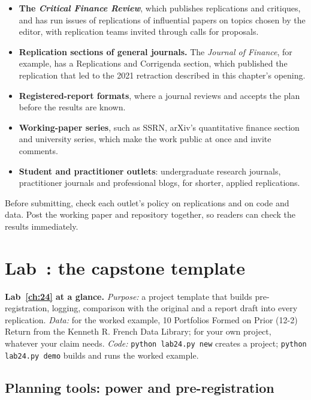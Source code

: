 \begin{itemize}
  \item \textbf{The \emph{Critical Finance Review}}, which publishes replications and critiques, and has run issues of replications of influential papers on topics chosen by the editor, with replication teams invited through calls for proposals.
  \item \textbf{Replication sections of general journals.} The \emph{Journal of Finance}, for example, has a Replications and Corrigenda section, which published the replication that led to the 2021 retraction described in this chapter's opening.
  \item \textbf{Registered-report formats}, where a journal reviews and accepts the plan before the results are known.
  \item \textbf{Working-paper series}, such as SSRN, arXiv's quantitative finance section and university series, which make the work public at once and invite comments.
  \item \textbf{Student and practitioner outlets}: undergraduate research journals, practitioner journals and professional blogs, for shorter, applied replications.
\end{itemize}

Before submitting, check each outlet's policy on replications and on code and data. Post the working paper and repository together, so readers can check the results immediately.

\section{Lab~\thechapter: the capstone template}
\label{sec:24-lab}

\begin{callout}
\textbf{Lab~\ref{ch:24} at a glance.} \emph{Purpose:} a project template that builds pre-registration, logging, comparison with the original and a report draft into every replication. \emph{Data:} for the worked example, 10 Portfolios Formed on Prior (12-2) Return from the Kenneth R. French Data Library; for your own project, whatever your claim needs. \emph{Code:} \texttt{python lab24.py new} creates a project; \texttt{python lab24.py demo} builds and runs the worked example.
\end{callout}

\subsection*{Planning tools: power and pre-registration}
\label{sec:24-planning-lab}

